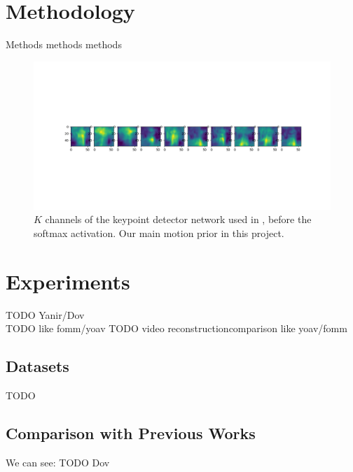 \documentclass{article}
\begin{document}
\section{Methodology}
Methods
methods
methods
\label{method}
\begin{figure}[ht]
\vskip 0.2in
\begin{center}
\centerline{\includegraphics[width=\columnwidth]{mask_10kp}}
\caption{
$K$ channels of the keypoint detector network used in
\cite{siarohin2020order}, before the softmax activation. Our main motion
prior in this project.
}
\label{mask-10kp}
\end{center}
\vskip -0.2in
\end{figure}
\section{Experiments}
TODO Yanir/Dov
\\
TODO like fomm/yoav
TODO video reconstructioncomparison like yoav/fomm
\subsection{Datasets}
TODO
\subsection{Comparison with Previous Works}
We can see:
\label{results}
TODO Dov
\end{document}
